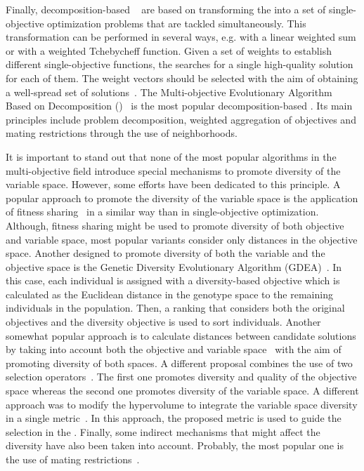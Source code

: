 Finally, decomposition-based \MOEAS{}~\cite{Joel:MOEAD_AMS} are based on transforming the \MOP{} into a set of 
single-objective optimization problems that are tackled simultaneously.
%
This transformation can be performed in several ways, e.g. with a linear weighted sum or with a weighted Tchebycheff function. 
%
Given a set of weights to establish different single-objective functions, the \MOEA{} searches for a single 
high-quality solution for each of them. 
%
The weight vectors should be selected with the aim of obtaining a well-spread set of solutions~\cite{Joel:Kalyanmoy}.
%
The Multi-objective Evolutionary Algorithm Based on Decomposition (\MOEAD{})~\cite{Joel:MOEAD} is the most popular 
decomposition-based \MOEA{}. 
%
Its main principles include problem decomposition, weighted aggregation of objectives and mating restrictions 
through the use of neighborhoods. 
%
%
%
 
It is important to stand out that none of the most popular algorithms in the multi-objective field introduce special 
mechanisms to promote diversity of the variable space.
%
However, some efforts have been dedicated to this principle.
%
A popular approach to promote the diversity of the variable space is the application of fitness sharing~\cite{Joel:NPGA} 
in a similar way than in single-objective optimization.
%
Although, fitness sharing might be used to promote diversity of both objective and variable space, most
popular variants consider only distances in the objective space.
%
Another \MOEA{} designed to promote diversity of both the variable and the objective space is the Genetic
Diversity Evolutionary Algorithm (GDEA)~\cite{toffolo2003genetic}.
%
In this case, each individual is assigned with a diversity-based objective which is calculated as the
Euclidean distance in the genotype space to the remaining individuals in the population.
%
Then, a ranking that considers both the original objectives and the diversity objective is used
to sort individuals.
%
Another somewhat popular approach is to calculate distances between candidate solutions by taking
into account both the objective and variable space~\cite{deb2005omni,shir2009enhancing} with the aim
of promoting diversity of both spaces.
%
A different proposal combines the use of two selection operators~\cite{chan2005evolutionary}.
%
The first one promotes diversity and quality of the objective space whereas the second one promotes diversity of the variable space.
%
A different approach was to modify the hypervolume to integrate the variable space diversity 
in a single metric~\cite{ulrich2010integrating}.
%
In this approach, the proposed metric is used to guide the selection in the \MOEA{}.
%
Finally, some indirect mechanisms that might affect the diversity have also been taken into account.
%
Probably, the most popular one is the use of mating restrictions~\cite{Joel:STUDY_MATTING_RESTRICTION,Joel:MOEAD_AMS}.

